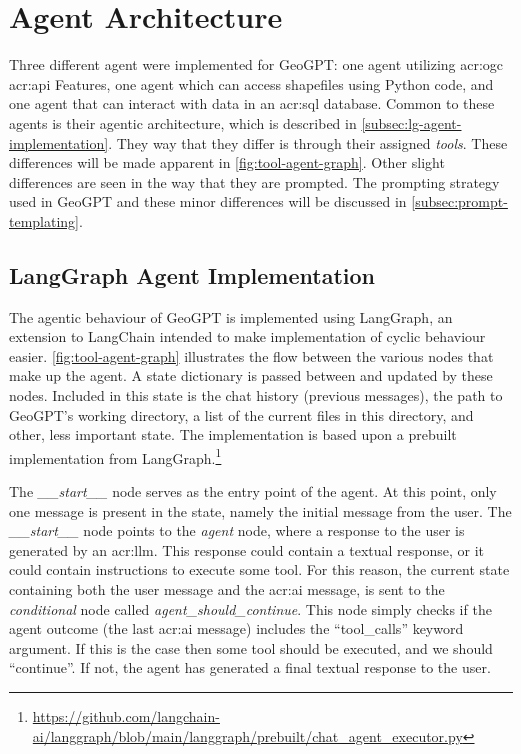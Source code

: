 \section{Agent Architecture}
\label{sec:agent-architecture}

Three different agent were implemented for GeoGPT: one agent utilizing \acrshort{acr:ogc} \acrshort{acr:api} Features, one agent which can access shapefiles using Python code, and one agent that can interact with data in an \acrshort{acr:sql} database. Common to these agents is their agentic architecture, which is described in \autoref{subsec:lg-agent-implementation}. They way that they differ is through their assigned \textit{tools}. These differences will be made apparent in \autoref{fig:tool-agent-graph}. Other slight differences are seen in the way that they are prompted. The prompting strategy used in GeoGPT and these minor differences will be discussed in \autoref{subsec:prompt-templating}.

\subsection{LangGraph Agent Implementation}
\label{subsec:lg-agent-implementation}

The agentic behaviour of GeoGPT is implemented using LangGraph, an extension to LangChain intended to make implementation of cyclic behaviour easier. \autoref{fig:tool-agent-graph} illustrates the flow between the various nodes that make up the agent. A state dictionary is passed between and updated by these nodes. Included in this state is the chat history (previous messages), the path to GeoGPT's working directory, a list of the current files in this directory, and other, less important state. The implementation is based upon a prebuilt implementation from LangGraph.\footnote{\url{https://github.com/langchain-ai/langgraph/blob/main/langgraph/prebuilt/chat_agent_executor.py}}

The \textit{\_\_start\_\_} node serves as the entry point of the agent. At this point, only one message is present in the state, namely the initial message from the user. The \textit{\_\_start\_\_} node points to the \textit{agent} node, where a response to the user is generated by an \acrshort{acr:llm}. This response could contain a textual response, or it could contain instructions to execute some tool. For this reason, the current state containing both the user message and the \acrshort{acr:ai} message, is sent to the \textit{conditional} node called \textit{agent\_should\_continue}. This node simply checks if the agent outcome (the last \acrshort{acr:ai} message) includes the \enquote{tool\_calls} keyword argument. If this is the case then some tool should be executed, and we should \enquote{continue}. If not, the agent has generated a final textual response to the user.

